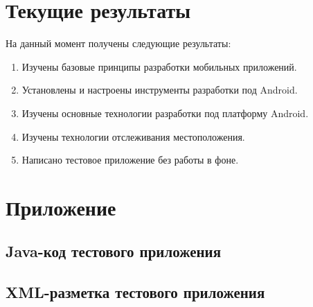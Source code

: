 \documentclass[a4paper,12pt]{article}
\begin{document}

\pagebreak


\section{Текущие результаты}

На данный момент получены следующие результаты:

\begin{enumerate}
\item Изучены базовые принципы разработки мобильных приложений.
\item Установлены и настроены инструменты разработки под Android.
\item Изучены основные технологии разработки под платформу Android.
\item Изучены технологии отслеживания местоположения.
\item Написано тестовое приложение без работы в фоне.
\end{enumerate}




\pagebreak
\section{Приложение}
\subsection{Java-код тестового приложения}

\subsection{XML-разметка тестового приложения}

\pagebreak
\end{document}
